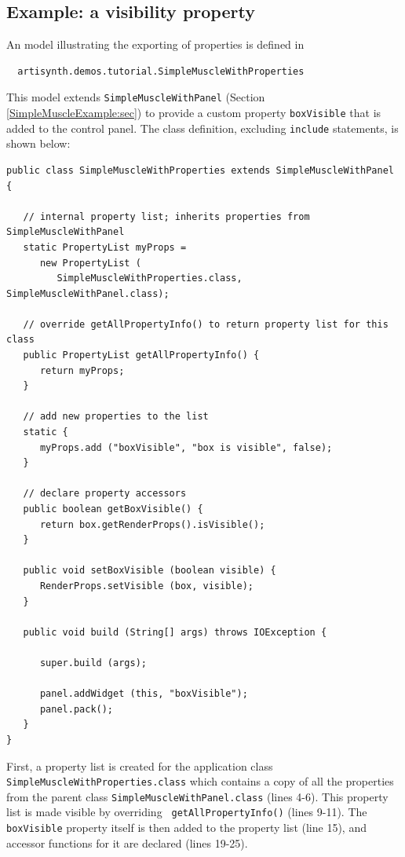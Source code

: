 \subsection{Example: a visibility property}
%
An model illustrating the exporting of properties is defined in
%
\begin{verbatim}
  artisynth.demos.tutorial.SimpleMuscleWithProperties
\end{verbatim}
%
This model extends {\tt SimpleMuscleWithPanel} (Section
\ref{SimpleMuscleExample:sec}) to provide a custom property
{\tt boxVisible} that is added to the control panel.
The class definition, excluding {\tt include} statements,
is shown below:
%
\lstset{numbers=left}
\begin{lstlisting}[]
public class SimpleMuscleWithProperties extends SimpleMuscleWithPanel {

   // internal property list; inherits properties from SimpleMuscleWithPanel
   static PropertyList myProps =
      new PropertyList (
         SimpleMuscleWithProperties.class, SimpleMuscleWithPanel.class);

   // override getAllPropertyInfo() to return property list for this class
   public PropertyList getAllPropertyInfo() {
      return myProps;
   }

   // add new properties to the list
   static {
      myProps.add ("boxVisible", "box is visible", false);
   }

   // declare property accessors
   public boolean getBoxVisible() {
      return box.getRenderProps().isVisible();
   }

   public void setBoxVisible (boolean visible) {
      RenderProps.setVisible (box, visible);
   }

   public void build (String[] args) throws IOException {

      super.build (args);

      panel.addWidget (this, "boxVisible");
      panel.pack();
   }
}
\end{lstlisting}
\lstset{numbers=none}
%
First, a property list is created for the application class {\tt
SimpleMuscleWithProperties.class} which contains a copy of all the
properties from the parent class {\tt SimpleMuscleWithPanel.class}
(lines 4-6). This property list is made visible by overriding {\tt
getAllPropertyInfo()} (lines 9-11). The {\tt boxVisible} property
itself is then added to the property list (line 15), and accessor
functions for it are declared (lines 19-25).

